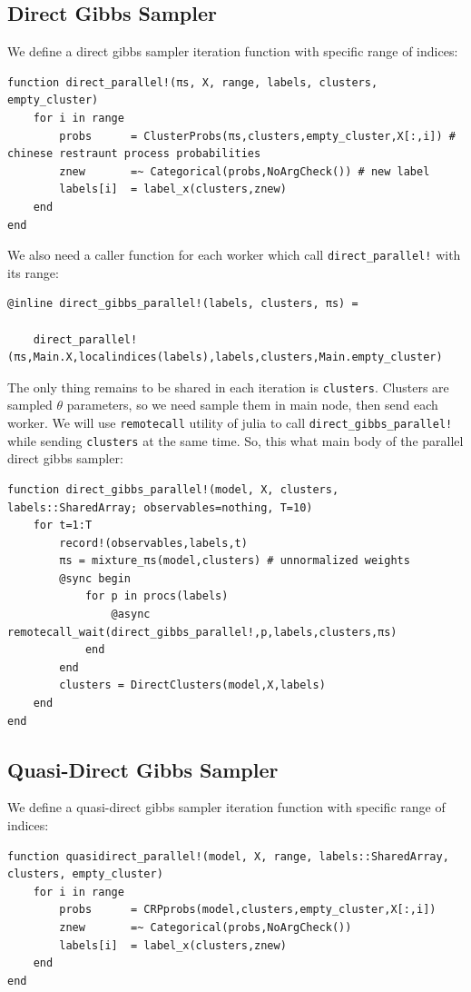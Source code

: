 \documentclass[a4paper]{article}
\begin{document}
\subsection{Direct Gibbs Sampler}
We define a direct gibbs sampler iteration function with specific range
of indices:
\begin{lstlisting}[linewidth=17cm]
function direct_parallel!(πs, X, range, labels, clusters, empty_cluster)
    for i in range
        probs      = ClusterProbs(πs,clusters,empty_cluster,X[:,i]) # chinese restraunt process probabilities
        znew       =~ Categorical(probs,NoArgCheck()) # new label
        labels[i]  = label_x(clusters,znew)
    end
end
\end{lstlisting}

We also need a caller function for each worker which call
\texttt{direct\_parallel!} with its range:
\begin{lstlisting}
@inline direct_gibbs_parallel!(labels, clusters, πs) =

    direct_parallel!(πs,Main.X,localindices(labels),labels,clusters,Main.empty_cluster)

\end{lstlisting}


The only thing remains to be shared in each iteration is
\texttt{clusters}. Clusters are sampled \(\theta\) parameters, so we
need sample them in main node, then send each worker. We will use
\texttt{remotecall} utility of julia to call
\texttt{direct\_gibbs\_parallel!} while sending \texttt{clusters} at the
same time. So, this what main body of the parallel direct gibbs sampler:

\begin{lstlisting}
function direct_gibbs_parallel!(model, X, clusters, labels::SharedArray; observables=nothing, T=10)
    for t=1:T
        record!(observables,labels,t)
        πs = mixture_πs(model,clusters) # unnormalized weights
        @sync begin
            for p in procs(labels)
                @async remotecall_wait(direct_gibbs_parallel!,p,labels,clusters,πs)
            end
        end
        clusters = DirectClusters(model,X,labels)
    end
end
\end{lstlisting}

\subsection{Quasi-Direct Gibbs Sampler}
We define a quasi-direct gibbs sampler iteration function with specific range
of indices:
\begin{lstlisting}[linewidth=17cm]
function quasidirect_parallel!(model, X, range, labels::SharedArray, clusters, empty_cluster)
    for i in range
        probs      = CRPprobs(model,clusters,empty_cluster,X[:,i])
        znew       =~ Categorical(probs,NoArgCheck())
        labels[i]  = label_x(clusters,znew)
    end
end
\end{lstlisting}
\end{document}
